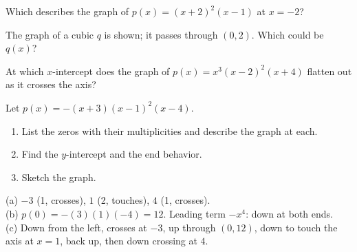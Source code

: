\begin{exo}{}
Which describes the graph of $p(x)=(x+2)^2(x-1)$ at $x=-2$?
\end{exo}
\begin{exo}{}
The graph of a cubic $q$ is shown; it passes through $(0,2)$. Which could be $q(x)$?
\end{exo}
\begin{exo}{}
At which $x$-intercept does the graph of $p(x)=x^3(x-2)^2(x+4)$ flatten out as it crosses the axis?
\end{exo}
\begin{exo}{}
Let $p(x)=-(x+3)(x-1)^2(x-4)$.
\begin{enumerate}[label=(\alph*)]
\item List the zeros with their multiplicities and describe the graph at each.
\item Find the $y$-intercept and the end behavior.
\item Sketch the graph.
\end{enumerate}
\begin{solution}
(a) $-3$ (1, crosses), $1$ (2, touches), $4$ (1, crosses).\\
(b) $p(0)=-(3)(1)(-4)=12$. Leading term $-x^4$: down at both ends.\\
(c) Down from the left, crosses at $-3$, up through $(0,12)$, down to touch the axis at $x=1$, back up, then down crossing at $4$.
\end{solution}
\end{exo}

